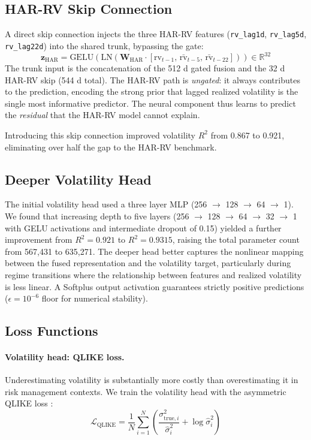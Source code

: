 \documentclass[10pt, twocolumn, a4paper]{article}
\begin{document}
\subsection{HAR{-}RV Skip Connection}

A direct skip connection injects the three HAR{-}RV features
(\texttt{rv\_lag1d}, \texttt{rv\_lag5d}, \texttt{rv\_lag22d}) into the
shared trunk, bypassing the gate:
\begin{equation}
    \mathbf{z}_{\text{HAR}} = \text{GELU}\!\left(\text{LN}\!\left(
    \mathbf{W}_{\text{HAR}} \cdot [\text{rv}_{t-1},\, \bar{\text{rv}}_{t-5},
    \,\bar{\text{rv}}_{t-22}]\right)\right) \in \mathbb{R}^{32}
\end{equation}
The trunk input is the concatenation of the 512 d gated fusion and the
32 d HAR{-}RV skip (544 d total). The HAR{-}RV path is \textit{ungated}:
it always contributes to the prediction, encoding the strong prior that
lagged realized volatility is the single most informative predictor. The
neural component thus learns to predict the \textit{residual} that the
HAR{-}RV model cannot explain.

Introducing this skip connection improved volatility $R^2$ from 0.867 to
0.921, eliminating over half the gap to the HAR{-}RV benchmark.

\subsection{Deeper Volatility Head}

The initial volatility head used a three layer MLP (256 $\to$ 128 $\to$
64 $\to$ 1). We found that increasing depth to five layers
(256 $\to$ 128 $\to$ 64 $\to$ 32 $\to$ 1 with GELU activations and
intermediate dropout of 0.15) yielded a further improvement from $R^2 =
0.921$ to $R^2 = 0.9315$, raising the total parameter count from 567{,}431
to 635{,}271. The deeper head better captures the nonlinear mapping between
the fused representation and the volatility target, particularly during
regime transitions where the relationship between features and realized
volatility is less linear. A Softplus output activation guarantees strictly
positive predictions ($\epsilon = 10^{-6}$ floor for numerical stability).

\subsection{Loss Functions}

\paragraph{Volatility head: QLIKE loss.}
Underestimating volatility is substantially more costly than
overestimating it in risk management contexts. We train the volatility head
with the asymmetric QLIKE loss \citep{patton2011volatility}:
\begin{equation}
    \mathcal{L}_{\text{QLIKE}} = \frac{1}{N} \sum_{i=1}^{N}
    \left( \frac{\sigma^2_{\text{true},i}}{\hat{\sigma}^2_i} +
    \log \hat{\sigma}^2_i \right)
\end{equation}
\end{document}
